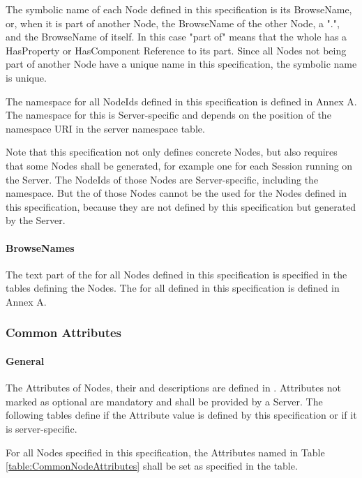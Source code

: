 The symbolic name of each \gls{Node} defined in this specification is its \gls{BrowseName}, or, when it is part of another Node, the \gls{BrowseName} of the other \gls{Node}, a ".", and the \gls{BrowseName} of itself. In this case "part of" means that the whole has a \gls{HasProperty} or \gls{HasComponent} Reference to its part. Since all \glspl{Node} not being part of another \gls{Node} have a unique name in this specification, the symbolic name is unique.

The namespace for all \glspl{NodeId} defined in this specification is defined in Annex A. The namespace for this  is Server-specific and depends on the position of the namespace URI in the server namespace table.

Note that this specification not only defines concrete \glspl{Node}, but also requires that some Nodes shall be generated, for example one for each Session running on the Server. The \glspl{NodeId} of those \glspl{Node} are Server-specific, including the namespace. But the  of those \glspl{Node} cannot be the  used for the Nodes defined in this specification, because they are not defined by this specification but generated by the Server.

\paragraph{BrowseNames}
The text part of the  for all \gls{Node}s defined in this specification is specified in the tables defining the Nodes. The  for all  defined in this specification is defined in Annex A.

\subsubsection{Common Attributes}

\paragraph{General}
The \glspl{Attribute} of \glspl{Node}, their  and descriptions are defined in \cite{UAPart3}. \glspl{Attribute} not marked as optional are mandatory and shall be provided by a Server. The following tables define if the \gls{Attribute} value is defined by this specification or if it is server-specific.

For all Nodes specified in this specification, the \glspl{Attribute} named in Table \ref{table:CommonNodeAttributes} shall be set as specified in the table.



